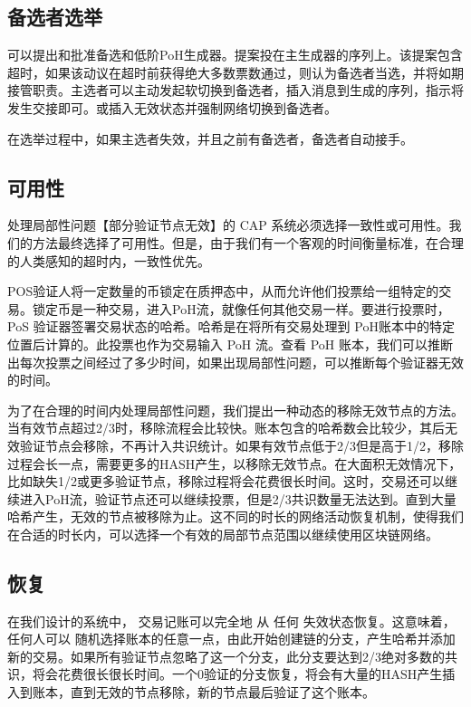 \documentclass[12pt, uft8]{ctexart}
\begin{document}
\subsection{备选者选举}
可以提出和批准备选和低阶PoH生成器。提案投在主生成器的序列上。该提案包含超时，如果该动议在超时前获得绝大多数票数通过，则认为备选者当选，并将如期接管职责。主选者可以主动发起软切换到备选者，插入消息到生成的序列，指示将发生交接即可。或插入无效状态并强制网络切换到备选者。  

在选举过程中，如果主选者失效，并且之前有备选者，备选者自动接手。


\subsection{可用性}\label{availability}
处理局部性问题【部分验证节点无效】的 CAP 系统必须选择一致性或可用性。我们的方法最终选择了可用性。但是，由于我们有一个客观的时间衡量标准，在合理的人类感知的超时内，一致性优先。

POS验证人将一定数量的币锁定在质押态中，从而允许他们投票给一组特定的交易。锁定币是一种交易，进入PoH流，就像任何其他交易一样。要进行投票时，PoS 验证器签署交易状态的哈希。哈希是在将所有交易处理到 PoH账本中的特定位置后计算的。此投票也作为交易输入 PoH 流。查看 PoH 账本，我们可以推断出每次投票之间经过了多少时间，如果出现局部性问题，可以推断每个验证器无效的时间。

为了在合理的时间内处理局部性问题，我们提出一种动态的移除无效节点的方法。当有效节点超过2/3时，移除流程会比较快。账本包含的哈希数会比较少，其后无效验证节点会移除，不再计入共识统计。如果有效节点低于2/3但是高于1/2，移除过程会长一点，需要更多的HASH产生，以移除无效节点。在大面积无效情况下，比如缺失1/2或更多验证节点，移除过程将会花费很长时间。这时，交易还可以继续进入PoH流，验证节点还可以继续投票，但是2/3共识数量无法达到。直到大量哈希产生，无效的节点被移除为止。这不同的时长的网络活动恢复机制，使得我们在合适的时长内，可以选择一个有效的局部节点范围以继续使用区块链网络。

\subsection{恢复}\label{availability}
在我们设计的系统中， 交易记账可以完全地 从 任何 失效状态恢复。这意味着，任何人可以 随机选择账本的任意一点，由此开始创建链的分支，产生哈希并添加新的交易。如果所有验证节点忽略了这一个分支，此分支要达到2/3绝对多数的共识，将会花费很长很长时间。一个0验证的分支恢复，将会有大量的HASH产生插入到账本，直到无效的节点移除，新的节点最后验证了这个账本。 
\end{document}
